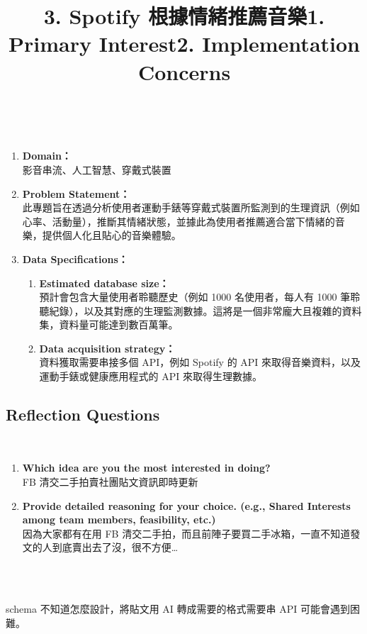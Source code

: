 \ \\
\title{\bf{3. Spotify 根據情緒推薦音樂}}
\begin{enumerate}
    \item {\bf{Domain：}} \\影音串流、人工智慧、穿戴式裝置
    \item {\bf{Problem Statement：}} \\此專題旨在透過分析使用者運動手錶等穿戴式裝置所監測到的生理資訊（例如心率、活動量），推斷其情緒狀態，並據此為使用者推薦適合當下情緒的音樂，提供個人化且貼心的音樂體驗。
    \item {\bf{Data Specifications：}}
        \begin{enumerate}
            \item {\bf{Estimated database size：}} \\預計會包含大量使用者聆聽歷史（例如 1000 名使用者，每人有 1000 筆聆聽紀錄），以及其對應的生理監測數據。這將是一個非常龐大且複雜的資料集，資料量可能達到數百萬筆。
            \item {\bf{Data acquisition strategy：}} \\資料獲取需要串接多個 API，例如 Spotify 的 API 來取得音樂資料，以及運動手錶或健康應用程式的 API 來取得生理數據。
        \end{enumerate}
\end{enumerate}

\subsection{Reflection Questions}
\ \\
\title{\bf{1. Primary Interest}} 
\begin{enumerate}
    \item {\bf{Which idea are you the most interested in doing?}} \\FB 清交二手拍賣社團貼文資訊即時更新
    \item {\bf{Provide detailed reasoning for your choice. (e.g., Shared Interests among team members, feasibility, etc.)}} \\因為大家都有在用 FB 清交二手拍，而且前陣子要買二手冰箱，一直不知道發文的人到底賣出去了沒，很不方便…
\end{enumerate}
\ \\
\title{\bf{2. Implementation Concerns}}
\ \\ 
\setlength{\parindent}{1.5em} 
\indent schema 不知道怎麼設計，將貼文用 AI 轉成需要的格式需要串 API 可能會遇到困難。
